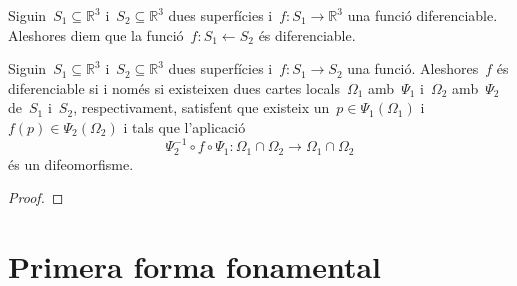 \documentclass[../../Main.tex]{subfiles}
\begin{document}
	\begin{definition}
		\label{def:funció diferenciable entre superfícies}
		Siguin~\(S_{1}\subseteq\mathbb{R}^{3}\) i~\(S_{2}\subseteq\mathbb{R}^{3}\) dues superfícies i~\(f\colon S_{1}\longrightarrow\mathbb{R}^{3}\) una funció diferenciable.
		Aleshores diem que la funció~\(f\colon S_{1}\longleftarrow S_{2}\) és diferenciable.
	\end{definition}
	\begin{proposition}
		Siguin~\(S_{1}\subseteq\mathbb{R}^{3}\) i~\(S_{2}\subseteq\mathbb{R}^{3}\) dues superfícies i~\(f\colon S_{1}\longrightarrow S_{2}\) una funció.
		Aleshores~\(f\) és diferenciable si i només si existeixen dues cartes locals~\(\Omega_{1}\) amb~\(\Psi_{1}\) i~\(\Omega_{2}\) amb~\(\Psi_{2}\) de~\(S_{1}\) i~\(S_{2}\), respectivament, satisfent que existeix un~\(p\in\Psi_{1}(\Omega_{1})\) i~\(f(p)\in\Psi_{2}(\Omega_{2})\) i tals que l'aplicació
		\[
		    \Psi_{2}^{-1}\circ f\circ \Psi_{1}\colon\Omega_{1}\cap\Omega_{2}\longrightarrow\Omega_{1}\cap\Omega_{2}
		\]
		és un difeomorfisme.
		\begin{proof}
		\end{proof}
	\end{proposition}
	\section{Primera forma fonamental}
\end{document}
